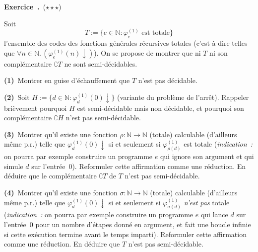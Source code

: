 \documentclass[12pt,a4paper]{article}
\theoremstyle{definition}
\newcommand\exercice{%
\refstepcounter{comcnt}\bigskip\noindent\textbf{Exercice~\thecomcnt.}}
\begin{document}
%

\exercice\label{exercise-indices-total-functions}\ (${\star}{\star}{\star}$)\par\nobreak

Soit
\[
T := \{e \in \mathbb{N} : \varphi^{(1)}_e\text{~est~totale}\}
\]
l'ensemble des codes des fonctions générales récursives totales
(c'est-à-dire telles que $\forall
n\in\mathbb{N}.\,(\varphi^{(1)}_e(n)\downarrow)$).  On se propose de
montrer que ni $T$ ni son complémentaire $\complement T$ ne sont
semi-décidables.

\textbf{(1)} Montrer en guise d'échauffement que $T$ n'est pas
décidable.

\textbf{(2)} Soit $H := \{d \in \mathbb{N} :
\varphi^{(1)}_d(0)\downarrow\}$ (variante du problème de l'arrêt).
Rappeler brièvement pourquoi $H$ est semi-décidable mais non
décidable, et pourquoi son complémentaire $\complement H$ n'est pas
semi-décidable.

\textbf{(3)} Montrer qu'il existe une fonction $\rho \colon \mathbb{N}
\to \mathbb{N}$ (totale) calculable (d'ailleurs même p.r.) telle que
$\varphi^{(1)}_d(0)\downarrow$ si et seulement si
$\varphi^{(1)}_{\rho(d)}$ est totale (\emph{indication :} on pourra
par exemple construire un programme $e$ qui ignore son argument et qui
simule $d$ sur l'entrée $0$).  Reformuler cette affirmation comme une
réduction.  En déduire que le complémentaire $\complement T$ de $T$
n'est pas semi-décidable.

\textbf{(4)} Montrer qu'il existe une fonction $\sigma \colon
\mathbb{N} \to \mathbb{N}$ (totale) calculable (d'ailleurs même p.r.)
telle que $\varphi^{(1)}_d(0)\downarrow$ si et seulement si
$\varphi^{(1)}_{\sigma(d)}$ \emph{n'est pas} totale
(\emph{indication :} on pourra par exemple construire un programme $e$
qui lance $d$ sur l'entrée $0$ pour un nombre d'étapes donné en
argument, et fait une boucle infinie si cette exécution termine avant
le temps imparti).  Reformuler cette affirmation comme une réduction.
En déduire que $T$ n'est pas semi-décidable.
\end{document}
